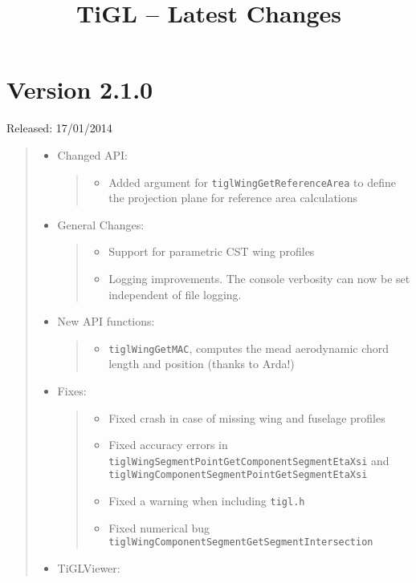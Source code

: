 \documentclass[]{scrartcl}
\author{}
\date{}
\begin{document}
\title{TiGL -- Latest Changes} \maketitle

\section{Version 2.1.0}

Released: 17/01/2014

\begin{quote}
\begin{itemize}
\item
  Changed API:

  \begin{quote}
  \begin{itemize}
  \itemsep1pt\parskip0pt
  \item
    Added argument for \texttt{tiglWingGetReferenceArea} to define the
    projection plane for reference area calculations
  \end{itemize}
  \end{quote}
\item
  General Changes:

  \begin{quote}
  \begin{itemize}
  \itemsep1pt\parskip0pt
  \item
    Support for parametric CST wing profiles
  \item
    Logging improvements. The console verbosity can now be set
    independent of file logging.
  \end{itemize}
  \end{quote}
\item
  New API functions:

  \begin{quote}
  \begin{itemize}
  \itemsep1pt\parskip0pt
  \item
    \texttt{tiglWingGetMAC}, computes the mead aerodynamic chord length
    and position (thanks to Arda!)
  \end{itemize}
  \end{quote}
\item
  Fixes:

  \begin{quote}
  \begin{itemize}
  \itemsep1pt\parskip0pt
  \item
    Fixed crash in case of missing wing and fuselage profiles
  \item
    Fixed accuracy errors in
    \texttt{tiglWingSegmentPointGetComponentSegmentEtaXsi} and
    \texttt{tiglWingComponentSegmentPointGetSegmentEtaXsi}
  \item
    Fixed a warning when including \texttt{tigl.h}
  \item
    Fixed numerical bug
    \texttt{tiglWingComponentSegmentGetSegmentIntersection}
  \end{itemize}
  \end{quote}
\item
  TiGLViewer:


\end{itemize}
\end{quote}
\end{document}

